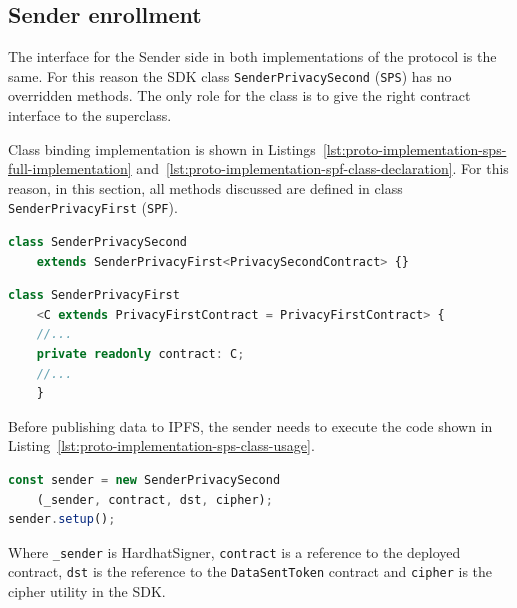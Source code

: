 \subsection{Sender enrollment}\label{subsec:implementation-sender-enrollment}
The interface for the Sender side in both implementations of the protocol is the same.
For this reason the SDK class \texttt{SenderPrivacySecond} (\texttt{SPS}) has no overridden methods.
The only role for the class is to give the right contract interface to the superclass.

Class binding implementation is shown in Listings~\ref{lst:proto-implementation-sps-full-implementation} and~\ref{lst:proto-implementation-spf-class-declaration}.
For this reason, in this section, all methods discussed are defined in class \texttt{SenderPrivacyFirst} (\texttt{SPF}).

\begin{lstlisting}[language=typescript,
    caption={Full \texttt{SenderPrivacySecond} class implementation},
    label={lst:proto-implementation-sps-full-implementation}]
class SenderPrivacySecond
    extends SenderPrivacyFirst<PrivacySecondContract> {}
\end{lstlisting}
\begin{lstlisting}[language=typescript,
    caption={\texttt{SenderPrivacyFirst} class declaration},
    label={lst:proto-implementation-spf-class-declaration}]
class SenderPrivacyFirst
    <C extends PrivacyFirstContract = PrivacyFirstContract> {
    //...
    private readonly contract: C;
    //...
    }
\end{lstlisting}

Before publishing data to IPFS, the sender needs to execute the code shown in Listing~\ref{lst:proto-implementation-sps-class-usage}.
\begin{lstlisting}[language=typescript,
    caption={\texttt{SenderPrivacySecond} class usage},
    label={lst:proto-implementation-sps-class-usage}]
const sender = new SenderPrivacySecond
    (_sender, contract, dst, cipher);
sender.setup();
\end{lstlisting}
Where \lstinline{_sender} is HardhatSigner, \lstinline{contract} is a reference to the deployed contract, \lstinline{dst} is the reference to the \texttt{DataSentToken} contract and \lstinline{cipher} is the cipher utility in the SDK.

